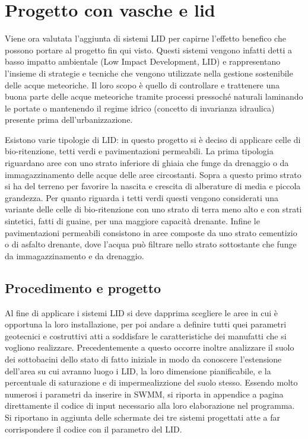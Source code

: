 \section{Progetto con vasche e lid}
Viene ora valutata l'aggiunta di sistemi LID per capirne l'effetto benefico che possono portare al progetto fin qui visto. 
Questi sistemi vengono infatti detti a basso impatto ambientale (Low Impact Development, LID) e rappresentano l’insieme di strategie e tecniche che vengono utilizzate nella gestione sostenibile delle acque meteoriche. 
Il loro scopo è quello di controllare e trattenere una buona parte delle acque meteoriche tramite processi pressoché naturali laminando le portate o mantenendo il regime idrico (concetto di invarianza idraulica) presente prima dell'urbanizzazione.

Esistono varie tipologie di LID: in questo progetto si  è deciso di applicare celle di bio-ritenzione, tetti verdi e pavimentazioni permeabili.
La prima tipologia riguardano aree con uno strato inferiore di ghiaia che funge da drenaggio o da immagazzinamento delle acque delle aree circostanti.
Sopra a questo primo strato si ha del terreno per favorire la nascita e crescita di alberature di media e piccola grandezza.
Per quanto riguarda i tetti verdi questi vengono considerati una variante delle celle di bio-ritenzione con uno strato di terra meno alto e con strati sintetici, fatti di guaine, per una maggiore capacità drenante.
Infine le pavimentazioni permeabili consistono in aree composte da uno strato cementizio o di asfalto drenante, dove l'acqua può filtrare nello strato sottostante che funge da immagazzinamento e da drenaggio.

\subsection{Procedimento e progetto}
Al fine di applicare i sistemi LID si deve dapprima scegliere le aree in cui è opportuna la loro installazione, per poi andare a definire tutti quei parametri geotecnici e costruttivi atti a soddisfare le caratteristiche dei manufatti che si vogliono realizzare.
Precedentemente a questo occorre inoltre analizzare il suolo dei sottobacini dello stato di fatto iniziale in modo da conoscere l'estensione dell'area su cui avranno luogo i LID, la loro dimensione pianificabile, e la percentuale di saturazione e di impermealizzione del suolo stesso. 
Essendo molto numerosi i parametri da inserire in SWMM, si riporta in appendice a pagina \pageref{appendix:codiceLID} direttamente il codice di input necessario alla loro elaborazione nel programma. 
Si riportano in aggiunta delle schermate dei tre sistemi progettati atte a far corrispondere il codice con il parametro del LID.

